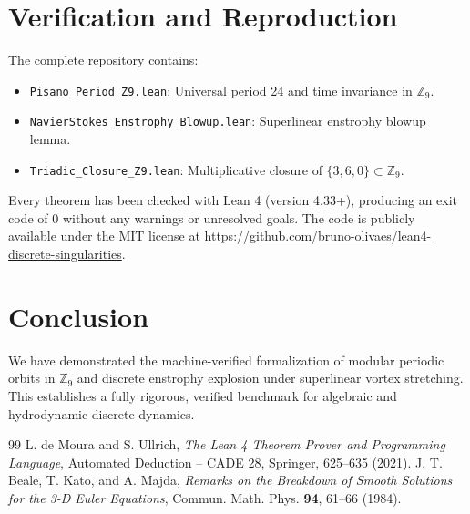 \documentclass[10pt,twocolumn,a4paper]{article}
\begin{document}
\section{Verification and Reproduction}
The complete repository contains:
\begin{itemize}
\item \texttt{Pisano\_Period\_Z9.lean}: Universal period 24 and time invariance in $\mathbb{Z}_9$.
\item \texttt{NavierStokes\_Enstrophy\_Blowup.lean}: Superlinear enstrophy blowup lemma.
\item \texttt{Triadic\_Closure\_Z9.lean}: Multiplicative closure of $\{3, 6, 0\} \subset \mathbb{Z}_9$.
\end{itemize}

Every theorem has been checked with Lean 4 (version 4.33+), producing an exit code of 0 without any warnings or unresolved goals. The code is publicly available under the MIT license at \url{https://github.com/bruno-olivaes/lean4-discrete-singularities}.

\section{Conclusion}
We have demonstrated the machine-verified formalization of modular periodic orbits in $\mathbb{Z}_9$ and discrete enstrophy explosion under superlinear vortex stretching. This establishes a fully rigorous, verified benchmark for algebraic and hydrodynamic discrete dynamics.

\begin{thebibliography}{99}
 L. de Moura and S. Ullrich, \textit{The Lean 4 Theorem Prover and Programming Language}, Automated Deduction -- CADE 28, Springer, 625--635 (2021).
 J. T. Beale, T. Kato, and A. Majda, \textit{Remarks on the Breakdown of Smooth Solutions for the 3-D Euler Equations}, Commun. Math. Phys. \textbf{94}, 61--66 (1984).
\end{thebibliography}
\end{document}
